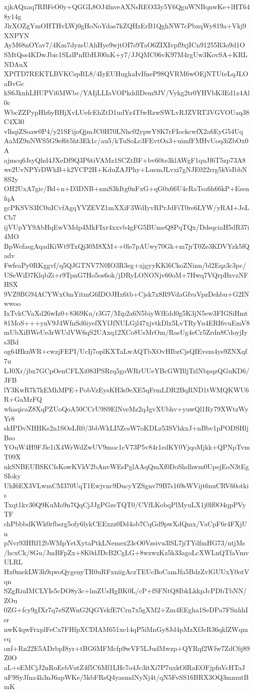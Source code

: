 xjkAQxaq7RBFeO0y+QGGL8OJ4fnveAXNsREO33y5Y6QguWNBqnwKe+lHT648y14g
JlrXOZgYmOHTHvLWj0gHoNoYdas7kZQHzErB1QghNW7cPbxqWy819a+Vkj9XNPYN
AyM68nOYav7/4Km7dyzsUAhHye9wjtOI7s9TaO6ZIXIvpf9xjICn91255R3o9d1O
SMtQss4KDwJbic1SLdPnRbHJ00aK+y7/JJQMC06vK97M4rgUw3KovSA+KRLNDAuX
XPfTD7REKTLBVKCspRL8/4IyEUHughaIvIfneP98QVRM6wOEjNTUteLqJLOaBvGc
kS6JknhLHUPVi6MWbc/YAIjLLIaVOPkddlDem9JV/Vykg2tr0YHVbK3Ed1z4Al0c
WbcZZPypHh6yBHjXvLUefcEhZtD1udYz4TfwRzwSWLvRJZVRT3VGVOUaq38C4X30
vlhqiZSoaw0P4/y21SFijoQjmJC0H70LNhc02ypwY8K7rFIockcwfX2a6EyG54Uq
AaMZ9nNWS5G9ef6t5ht3Ek1c/au5/kTuSoLc3FEvtOa3+uimfFMHvUoq3iZbOx0A
ajmcq6JsyQhd4JXeDf9Q3P6tiVAMz1SCZtBF+bv60te3klAWgF1quJf6T5zp73A8
we2UvNPYrDWhB+k2VCP2H+KduZAJPhy+LuemJLvxi7gNJE022rrg5kVsIbbN8S2y
OH2UxA7gic/Bd+n+D3DNB+nmS3kItg0nFxG+qG0x66U4cRaTsa6h66kP+EsenfqA
gcPKSVS3IC0uICvfAgqYVZEVZ1mXXiF3WdIyvRPrJdFiT0re6LYW/yRAI+JeLCb7
ijVUpYY9AbHqEwVMdp4MkFIxr4xxvb4gFG5BUmeQ8PqTQx/DdsqciaH5dR37i4MO
BpWefasgAqadKiWt9TxQj30M8XM++0le7pAUwy70Gk+m7jrT0Ze3KDVYzk5fQadv
FwfeaPy0RKggvf/q5QJGTNV7N0IO3R3eg+xjgyyKKl6CkoZNinn/bl2Eqz3c3pc/
USeWiD7KlqbZi+r9TpnG7Ho5os6ok/jDRyLONONjv60oM+7Hwq7VQrpBzvzNFHSX
9VZ9BG94ACYWxOmYitmG6IDOJHx6tb+Cjsk7x8R9VdaGfvaVpzDehbu+G2INwwoo
IxTvkCVaXd26wIz0+8369Ku/r3G7/Mip2a6N5biyWfEdd0g5K3jN5ew3FIGSiHmt
81MoS+++ynV9J4WfnSd6iyefXYfJfNULGjl47xjvtkDlx5LvTRyYu4ERI6vuEmV8
mUbXiBWeUe3rWUdVW6qS2UAxq12XCo8UsMrOm/RasUg4eCr5Zrdn8CdoyjIys3Bd
og64HknWR+cwzjFEPI/UcIj7oplKXTaLwAQTbXOvHIbzCjsQIEvsm4ys9ZNXqf7u
LJ0Xr/jbx7GCpOenCFLXi083PSRrq5goWRrUUeYBcGWBljTzlNbpqzQGuKD6/JFB
lY3KwR7k7kEMhMPE+PobVzEysKH3s9eXE5qFrmLDR2BqRND1tWMQKWU6R+GaMzFQ
whaqicaZ8XqPZUoQoA50CCrU9S9ElNveMz2qJgvXUbhv+yuwQl1Ry79XWtzWyYr8
skIPDvNHHKs2n1SOsLR0/3bbWkLI5ZcsW7oKDLz53SVhkxJ+nBbv1pPODSHljBso
YOuW4H9FJle1iX4WrWdZwUV9moc1cV73P5v84r1edKY0YjqoMjkk+QPNpTvmT09X
nkSNBEUBSKCfsKowKVkV2bAnvWEsPglAAqQmXf0DoShdhwm0UpejEoN3tEgSIoky
UhI6EX3VLwmCM370UqT1Ewjvnc9DucyYZSgnv79B7s169sWVijt6nuCRV60otkis
Txqt1kv30Q9KuMo9n7QqCjJJgPGzeTQT0/CVfLKobqPlMyuLX1j0lf0O4qpPVyTF
chPbbbdKWk0rfbsrg5ofy6lykCEExzz0Dd4ob7CqGd9pwXdQmx/VaCpF6r4FXjUn
pNvr93HRf12bWMpYetXytaPtkLNemex23cO0Vzsivu3lSL7jiTYdfmHG73/ntjMs
/hcxCk/8Gu/JmBFpZx+8K0dJDcB2CgLG+8wzwzKz5k33agoLcXWLnQTfaVmvULRL
Hx0mekLW3h9qwoQygenyTR0uRFxniigAczTEUcBoCamJfa5BdzZvlGUUxY0otVqn
SZgRiuIMCLYIs5cDO8y3c+lmZUsHgBK0L/cP+fSFNtQ8IbkLkkpJcPDbTbNN/ZOu
0ZG+fcy9gIXr7q7eSZWnG2QGYskfE7Crn7x5gXM2+Zm4EEgha1SeDPa7FSnhhIsr
nwK4qwFrxplFeCx7FHfpXCDIAM651xe14qP5iMnGy8Jd4pMzXfJeR36qklZWqmcq
oxf+Rn22E5ADrbpI8yr+tBG6MFMcfp9wVF5LJudMwzp+QYRqf2Wfw7ZdC6j89Z0O
aL+eEMCjJ2nRoEebVutZ4f5C6Mf1LHc7o4Jc3itXi7P7uxkOlRaEOFjpfnVcHTaJ
uF9SyJfna4h3nJ6apWKe/5kbFRsQ4yasmdNyNj4t/qN5FvSS16BRX3OQ3mmutBmK
